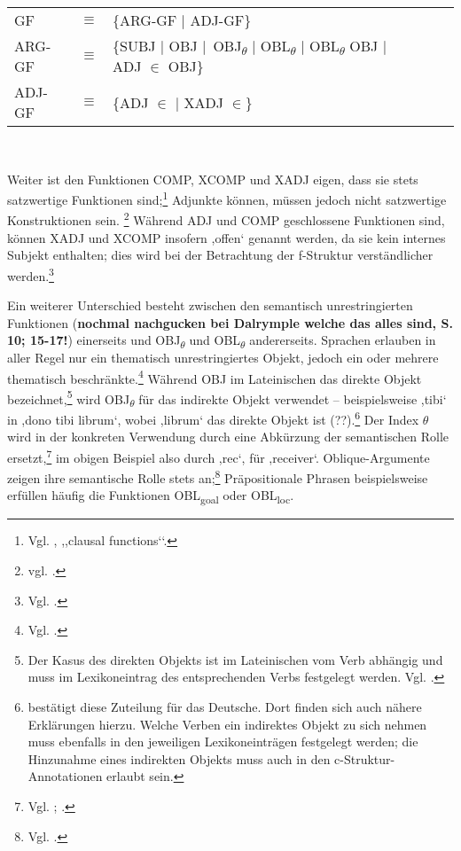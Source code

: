 \documentclass[12pt,a4paper]{article}
\begin{document}
\begin{singlespace}
\begin{tabular}{ l  l  l  c  c  c  c }
GF & $\equiv$ & \{ARG-GF $\mid$ ADJ-GF\} \\
ARG-GF & $\equiv$ & \{SUBJ $\mid$ OBJ $\mid$\ OBJ\textsubscript{$\theta$} $\mid$ OBL\textsubscript{$\theta$} $\mid$ OBL\textsubscript{$\theta$} OBJ $\mid$ ADJ $\in$ OBJ\} \\
ADJ-GF & $\equiv$ & \{ADJ $\in$ $\mid$ XADJ $\in$\} \\
\end{tabular}\\
\end{singlespace}

Weiter ist den Funktionen COMP, XCOMP und XADJ eigen, dass sie stets satzwertige Funktionen sind;\footnote{Vgl. \cite[24]{Dal}, ,,clausal functions‘‘.} Adjunkte können, müssen jedoch nicht satzwertige Konstruktionen sein. \footnote{vgl. \cite[40]{Skript}.} Während ADJ und COMP geschlossene Funktionen sind, können XADJ und XCOMP insofern ,offen‘ genannt werden, da sie kein internes Subjekt enthalten; dies wird bei der Betrachtung der f-Struktur verständlicher werden.\footnote{Vgl. \cite[10; 14; 24]{Dal}.}

Ein weiterer Unterschied besteht zwischen den semantisch unrestringierten Funktionen (\textbf{nochmal nachgucken bei Dalrymple welche das alles sind, S. 10; 15-17!}) einerseits und OBJ\textsubscript{$\theta$} und OBL\textsubscript{$\theta$} andererseits. Sprachen erlauben in aller Regel nur ein thematisch unrestringiertes Objekt, jedoch ein oder mehrere thematisch beschränkte.\footnote{Vgl. \cite[21]{Dal}.} Während OBJ im Lateinischen das direkte Objekt bezeichnet,\footnote{Der Kasus des direkten Objekts ist im Lateinischen vom Verb abhängig und muss im Lexikoneintrag des entsprechenden Verbs festgelegt werden. Vgl. \cite[30]{Skript}.} wird OBJ\textsubscript{$\theta$} für das indirekte Objekt verwendet – beispielsweise ,tibi‘ in ,dono tibi librum‘, wobei ,librum‘ das direkte Objekt ist (??).\footnote{\cite[30]{Skript} bestätigt diese Zuteilung für das Deutsche. Dort finden sich auch nähere Erklärungen hierzu. Welche Verben ein indirektes Objekt zu sich nehmen muss ebenfalls in den jeweiligen Lexikoneinträgen festgelegt werden; die Hinzunahme eines indirekten Objekts muss auch in den c-Struktur-Annotationen erlaubt sein.}  Der Index $\theta$ wird in der konkreten Verwendung durch eine Abkürzung der semantischen Rolle ersetzt,\footnote{Vgl. \cite[32]{Skript}; \cite[21]{Rohrer}.} im obigen Beispiel also durch ,rec‘, für ,receiver‘. Oblique-Argumente zeigen ihre semantische Rolle stets an;\footnote{Vgl. \cite[26]{Dal}.} Präpositionale Phrasen beispielsweise erfüllen häufig die Funktionen OBL\textsubscript{goal} oder OBL\textsubscript{loc}.
\end{document}
